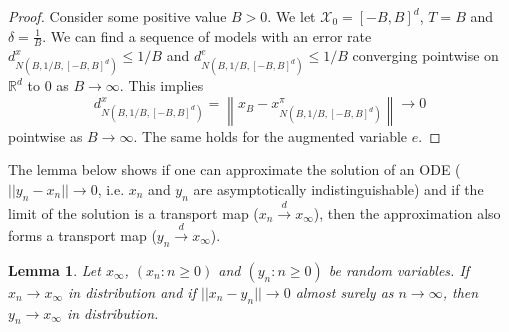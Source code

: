 \documentclass{article}
\def\gX{{\mathcal{X}}}
\newcommand{\R}{\mathbb{R}}
\newcommand{\norm}[1]{\left\lVert#1\right\rVert}
\newtheorem{lemma}{Lemma}
\begin{document}
\begin{proof}
Consider some positive value $B>0$. 
We let $\gX_0=[-B,B]^d$, $T=B$ and $\delta=\frac{1}{B}$. 
We can find a sequence of models with an error rate $d^x_{N(B,1/B,[-B,B]^d)} \leq 1/B$ and $d^e_{N(B,1/B,[-B,B]^d)} \leq 1/B$ converging pointwise on $\R^d$ to $0$ as $B\rightarrow\infty$.
This implies 
$$d^x_{N(B,1/B,[-B,B]^d)} = \norm{x_{B}-x^\pi_{N(B,1/B,[-B,B]^d)}}\rightarrow0$$
pointwise as $B\rightarrow\infty$. 
The same holds for the augmented variable $e$. 
\end{proof}


The lemma below shows if one can approximate the solution of an ODE ($||y_n-x_n||\rightarrow0$, i.e. $x_n$ and $y_n$ are asymptotically indistinguishable) and if the limit of the solution is a transport map ($x_n\overset{d}{\rightarrow} x_\infty$), then the approximation also forms a transport map ($y_n\overset{d}{\rightarrow} x_\infty$). 
\begin{lemma}
\label{lem:conv_indistinguishable}
Let $x_\infty$, $(x_n:n\geq0)$ and $(y_n:n\geq0)$ be random variables. 
If $x_n\rightarrow x_\infty$ in distribution and if $||x_n - y_n||\rightarrow0$ almost surely as $n\rightarrow\infty$, then $y_n\rightarrow x_\infty$ in distribution. 
\end{lemma}
\end{document}
